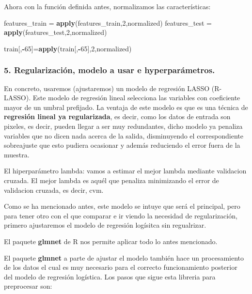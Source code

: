 \documentclass[]{article}
\newenvironment{Shaded}{\begin{snugshade}}{\end{snugshade}}
\newcommand{\KeywordTok}[1]{\textcolor[rgb]{0.13,0.29,0.53}{\textbf{#1}}}
\newcommand{\DecValTok}[1]{\textcolor[rgb]{0.00,0.00,0.81}{#1}}
\newcommand{\StringTok}[1]{\textcolor[rgb]{0.31,0.60,0.02}{#1}}
\newcommand{\OperatorTok}[1]{\textcolor[rgb]{0.81,0.36,0.00}{\textbf{#1}}}
\newcommand{\NormalTok}[1]{#1}
\begin{document}
Ahora con la función definida antes, normalizamos las características:

\begin{Shaded}
\begin{Highlighting}[]
\NormalTok{features_train =}\StringTok{ }\KeywordTok{apply}\NormalTok{(features_train,}\DecValTok{2}\NormalTok{,normalized)}
\NormalTok{features_test =}\StringTok{ }\KeywordTok{apply}\NormalTok{(features_test,}\DecValTok{2}\NormalTok{,normalized)}

\NormalTok{train[,}\OperatorTok{-}\DecValTok{65}\NormalTok{]=}\KeywordTok{apply}\NormalTok{(train[,}\OperatorTok{-}\DecValTok{65}\NormalTok{],}\DecValTok{2}\NormalTok{,normalized)}
\end{Highlighting}
\end{Shaded}

\subsubsection{5. Regularización, modelo a usar e
hyperparámetros.}\label{regularizacion-modelo-a-usar-e-hyperparametros.}

En concreto, usaremos (ajustaremos) un modelo de regresión LASSO
(R-LASSO). Este modelo de regresión lineal selecciona las variables con
coeficiente mayor de un umbral prefijado. La ventaja de este modelo es
que es una técnica de \textbf{regresión lineal ya regularizada}, es
decir, como los datos de entrada son pixeles, es decir, pueden llegar a
ser muy redundantes, dicho modelo ya penaliza variables que no dicen
nada acerca de la salida, disminuyendo el correspondiente sobreajuste
que esto pudiera ocasionar y además reduciendo el error fuera de la
muestra.

El hiperparámetro lambda: vamos a estimar el mejor lambda mediante
validacion cruzada. El mejor lambda es aquél que penaliza minimizando el
error de validacion cruzada, es decir, cvm.

Como se ha mencionado antes, este modelo se intuye que será el
principal, pero para tener otro con el que comparar e ir viendo la
necesidad de regularización, primero ajustaremos el modelo de regresión
logísitca sin regualrizar.

El paquete \textbf{glmnet} de R nos permite aplicar todo lo antes
mencionado.

El paquete \textbf{glmnet} a parte de ajustar el modelo también hace un
procesamiento de los datos el cual es muy necesario para el correcto
funcionamiento posterior del modelo de regresión logística. Los pasos
que sigue esta libreria para preprocesar son:
\end{document}
